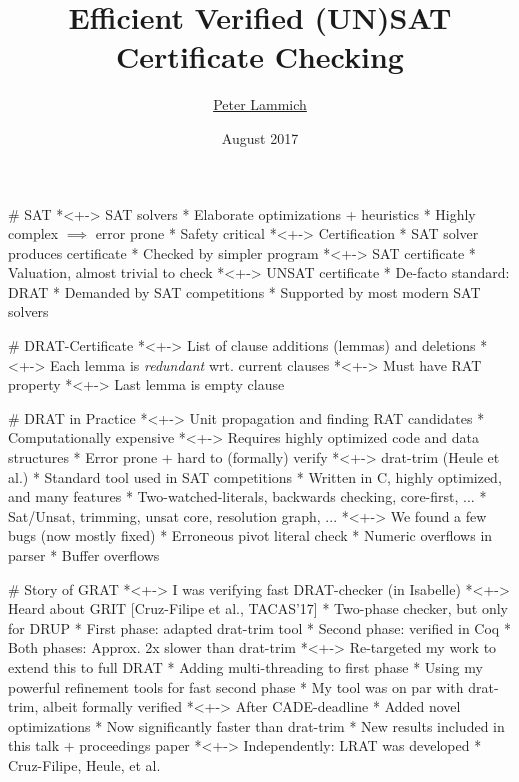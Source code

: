 \documentclass[fleqn]{beamer}
\title{Efficient Verified (UN)SAT Certificate Checking}
\author[Peter Lammich]{\underline{Peter Lammich}}
\institute[TUM] %
{ TU M\"unchen %
}
\date {August 2017}
\begin{document}
% 

\begin{frame}
  \titlepage
\end{frame}


# SAT
  *<+-> SAT solvers
    * Elaborate optimizations + heuristics
    * Highly complex $\implies$ error prone
    * Safety critical
  *<+-> Certification
    * SAT solver produces certificate
    * Checked by simpler program
  *<+-> SAT certificate
    * Valuation, almost trivial to check
  *<+-> UNSAT certificate
    * De-facto standard: DRAT
    * Demanded by SAT competitions
    * Supported by most modern SAT solvers
    
# DRAT-Certificate
  *<+-> List of clause additions (lemmas) and deletions
  *<+-> Each lemma is \emph{redundant} wrt. current clauses
    *<+-> Must have RAT property
  *<+-> Last lemma is empty clause
    
    
    
# DRAT in Practice
  *<+-> Unit propagation and finding RAT candidates
    * Computationally expensive
  *<+-> Requires highly optimized code and data structures
    * Error prone + hard to (formally) verify
  *<+-> drat-trim (Heule et al.) 
    * Standard tool used in SAT competitions
    * Written in C, highly optimized, and many features
    * Two-watched-literals, backwards checking, core-first, ...
    * Sat/Unsat, trimming, unsat core, resolution graph, ...
    *<+-> We found a few bugs (now mostly fixed)
      * Erroneous pivot literal check
      * Numeric overflows in parser
      * Buffer overflows
      

# Story of GRAT      
  *<+-> I was verifying fast DRAT-checker (in Isabelle)
  *<+-> Heard about GRIT [Cruz-Filipe et al., TACAS'17]
    * Two-phase checker, but only for DRUP
    * First phase: adapted drat-trim tool
    * Second phase: verified in Coq
    * Both phases: Approx. 2x slower than drat-trim
  *<+-> Re-targeted my work to extend this to full DRAT
    * Adding multi-threading to first phase
    * Using my powerful refinement tools for fast second phase
    * My tool was on par with drat-trim, albeit formally verified
  *<+-> After CADE-deadline
    * Added novel optimizations
    * Now significantly faster than drat-trim
    * New results included in this talk + proceedings paper
  *<+-> Independently: LRAT was developed
    * Cruz-Filipe, Heule, et al.
      
\end{document}
